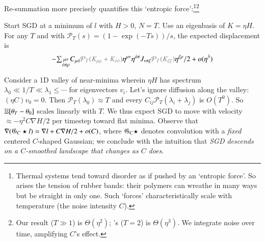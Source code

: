 Re-summation more precisely quantifies this `entropic force':\footnote{
    Thermal systems tend toward disorder as if pushed by an
    `entropic force'.
    So arises the tension of rubber
    bands: their polymers can wreathe in
    many ways but be straight in only one.
    Such `forces' characteristically 
    scale with
    temperature (the noise intensity $C$).
}\footnote{
    Our result ($T\gg 1$) is $\Theta(\eta^2)$; \cite{ya19b}'s
    ($T=2$) is $\Theta(\eta^3)$.  We
    integrate noise over time, amplifying $C$'s
    effect. 
}
%
\begin{cor}\label{cor:entropic}%
    Start SGD at a minimum of $l$ with $H>0$, $N=T$.  Use
    an eigenbasis of $K=\eta H$.  
    For any $T$ and
    with ${\mathcal P}_T(s) = (1 - \exp(-Ts))/s$,
    the 
    expected displacement is
    $$
        -
        {\textstyle\sum_{\substack{\mu\nu    \\ \omicron\pi\rho}}}
            C_{\mu\omicron}
            {\color{gray}{\mathcal P}_T(K_{\mu\mu} + K_{\omicron\omicron})}
            \eta^{\mu\nu}\eta^{\omicron\pi}
            J_{\nu\pi\xi}
            {\color{gray}{\mathcal P}_T(K_{\xi\xi})}\eta^{\xi\rho}/2
        + o(\eta^3)
        \squish\squish
    $$
\end{cor}

Consider a 1D valley of near-minima wherein $\eta H$ has spectrum
$\lambda_0 \ll 1/T \ll \lambda_1 \leq \cdots$ for eigenvectors
$v_i$.  Let's ignore diffusion along the valley: $(\eta C) v_0 =
0$.
%
Then ${\mathcal P}_T(\lambda_0)\approx T$ and every
$C_{ij}{\mathcal P}_T(\lambda_i+\lambda_j)$ is $O(T^0)$.  So $\mathbb{E}[\theta_T-\theta_0]$
scales linearly with $T$.  We thus expect SGD to move with
velocity $\approx -\eta^2 C\nabla H/2$ per timestep toward flat minima.  
Observe that $\nabla ({\frak G}_C \star l) = \nabla l+C\nabla
H/2 + o(C)$, where ${\frak G}_C \star$ denotes convolution with a
\emph{fixed} centered $C$-shaped Gaussian; we conclude with the
intuition that \emph{SGD descends on a $C$-smoothed landscape that
changes as $C$ does}.  %

